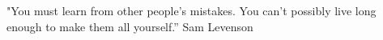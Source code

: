 \begin{epigrafe}
    \vspace*{\fill}
	\begin{flushright}
	"You must learn from other people’s mistakes. You can’t possibly live long enough to make them all yourself.” Sam Levenson
	\end{flushright}
\end{epigrafe}
